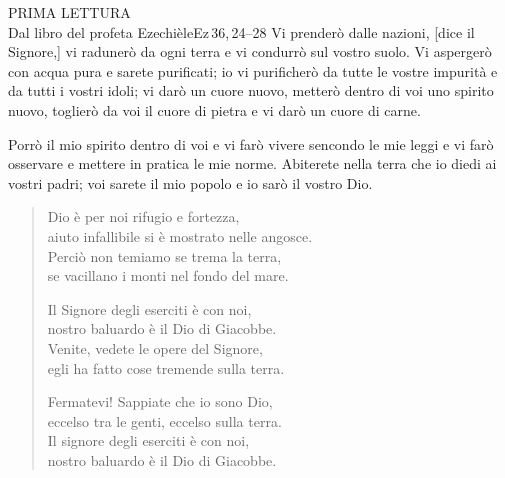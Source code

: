 \documentclass[11pt]{book}
\begin{document}
\vspace{5pt}

\colletta[4]

\newpage


\begin{lettura}{PRIMA LETTURA\\Dal libro del profeta Ezechièle}{Ez\,36,\,24--28}
Vi prenderò dalle nazioni, [dice il Signore,] vi radunerò
da ogni terra e vi condurrò sul vostro suolo. Vi aspergerò con acqua pura e
sarete purificati; io vi purificherò da tutte le vostre impurità e da tutti i
vostri idoli; vi darò un cuore nuovo, metterò dentro di voi uno spirito nuovo,
toglierò da voi il cuore di pietra e vi darò un cuore di carne.

Porrò il mio spirito dentro di voi e vi farò vivere sencondo le mie leggi e vi
farò osservare e mettere in pratica le mie norme. Abiterete nella terra che io
diedi ai vostri padri; voi sarete il mio popolo e io sarò il vostro Dio.
\end{lettura}

\vspace{\baselineskip}
\renewcommand{\versettosalmo}{Dio è per noi rifugio e fortezza.}
\noindent{}

\vspace{10pt}

\noindent\rispostasalmo

\nobreak
\begin{verse}
Dio è per noi rifugio e fortezza,\\
aiuto infallibile si è mostrato nelle angosce.\\
Perciò non temiamo se trema la terra,\\
se vacillano i monti nel fondo del mare.\\
\rispostasalmo

Il Signore degli eserciti è con noi,\\
nostro baluardo è il Dio di Giacobbe.\\
Venite, vedete le opere del Signore,\\
egli ha fatto cose tremende sulla terra.\\
\rispostasalmo

Fermatevi! Sappiate che io sono Dio,\\
eccelso tra le genti, eccelso sulla terra.\\
Il signore degli eserciti è con noi,\\
nostro baluardo è il Dio di Giacobbe.\\
\rispostasalmo
\end{verse}
\end{document}
